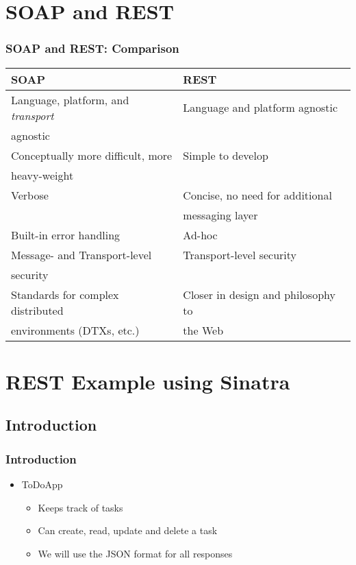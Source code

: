 \documentclass{beamer}
\begin{document}
\section{SOAP and REST} 
\begin{frame}[fragile]\frametitle{SOAP and REST: Comparison} 

  \begin{center}
    \begin{tabular}{|l|l|}
\hline 
\textbf{SOAP} & \textbf{REST} \\ 
\hline 
Language, platform, and \textit{transport} & Language and platform agnostic \\ 
agnostic  & \\
\hline 
Conceptually more difficult, more & Simple to develop \\ 
heavy-weight  & \\
\hline 
Verbose & Concise, no need for additional \\
 & messaging layer  \\ 
\hline 
Built-in error handling & Ad-hoc \\ 
\hline 
Message- and Transport-level & Transport-level security \\ 
security & \\
\hline 
Standards for complex distributed & Closer in design and philosophy to \\ 
environments (DTXs, etc.) & the Web \\
\hline 
    \end{tabular}   
  \end{center}

\end{frame}



\section{REST Example using Sinatra} 
\subsection{Introduction}
\begin{frame}[fragile]\frametitle{Introduction} 

  \begin{itemize}
    \item ToDoApp
    \begin{itemize}
      \item Keeps track of tasks
      \item Can create, read, update and delete a task
      \item We will use the JSON format for all responses
    \end{itemize}
  \end{itemize}

\end{frame}
\end{document}
